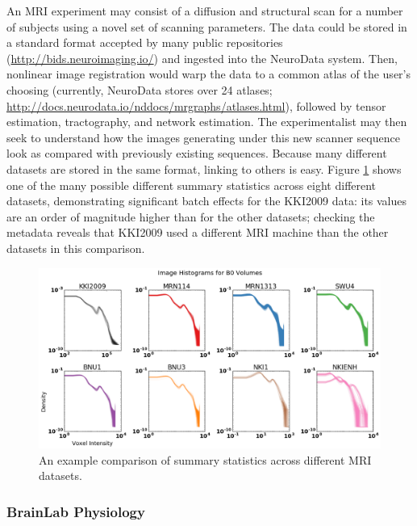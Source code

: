 An MRI experiment may consist of a diffusion and structural scan for a number of subjects using a novel set of scanning parameters.  The data could be stored in a standard format accepted by many public repositories (\url{http://bids.neuroimaging.io/}) and ingested into the NeuroData system.  Then, nonlinear image registration would warp the data to a common atlas of the user's choosing (currently, NeuroData stores over 24 atlases; \url{http://docs.neurodata.io/nddocs/mrgraphs/atlases.html}), followed by tensor estimation, tractography, and network estimation.  The experimentalist may then seek to understand how the images generating under this new scanner sequence look as compared with previously existing sequences. Because many different datasets are stored in the same format, linking to others is easy.  Figure \ref{f:mri} shows one of the many possible different summary statistics across eight different datasets, demonstrating significant batch effects for the KKI2009 data: its values are an order of magnitude higher than for the other datasets; checking the metadata reveals that KKI2009 used a different MRI machine than the other datasets in this comparison.


\begin{figure}%
\includegraphics[width=1\textwidth]{figs/multi_b0s_colourful.png}
\caption{An example comparison of summary statistics across different MRI datasets.
}
\label{f:mri}
\end{figure}


\subsubsection{BrainLab Physiology}

